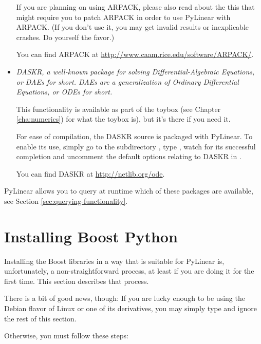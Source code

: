 \begin{itemize}
    If you are planning on using ARPACK, please also read about the
    this  that might
    require you to patch ARPACK in order to use PyLinear with ARPACK.
    (If you don't use it, you may get invalid results or inexplicable
    crashes. Do yourself the favor.)

    You can find ARPACK at \url{http://www.caam.rice.edu/software/ARPACK/}.

  \item 
    \em{DASKR}, a well-known package for solving Differential-Algebraic
    Equations, or DAEs for short. DAEs are a generalization of Ordinary
    Differential Equations, or ODEs for short.

    This functionality is available as part of the toybox (see Chapter
    \ref{cha:numerics}) for what the toybox is), but it's there if you need it.

    For ease of compilation, the DASKR source is packaged with PyLinear. To
    enable its use, simply go to the subdirectory , type
    , watch for its successful completion and uncomment the
    default options relating to DASKR in .

    You can find DASKR at \url{http://netlib.org/ode}.
\end{itemize}

PyLinear allows you to query at runtime which of these packages are available,
see Section \ref{sec:querying-functionality}.

\section{Installing Boost Python}

\label{sec:install-bpl}

Installing the Boost libraries in a way that is suitable for PyLinear
is, unfortunately, a non-straightforward process, at least if you are
doing it for the first time. This section describes that process.

There is a bit of good news, though: If you are lucky enough to be
using the Debian flavor of Linux or one of its derivatives, you may
simply type  and ignore the
rest of this section.

Otherwise, you must follow these steps:

